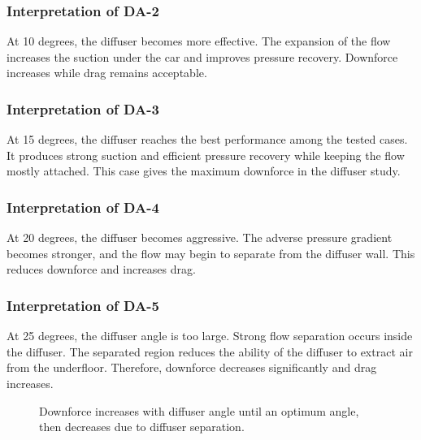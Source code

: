 \documentclass[12pt,a4paper]{article}
\begin{document}
\subsubsection{Interpretation of DA-2}

At 10 degrees, the diffuser becomes more effective. The expansion of the flow increases the suction under the car and improves pressure recovery. Downforce increases while drag remains acceptable.

\subsubsection{Interpretation of DA-3}

At 15 degrees, the diffuser reaches the best performance among the tested cases. It produces strong suction and efficient pressure recovery while keeping the flow mostly attached. This case gives the maximum downforce in the diffuser study.

\subsubsection{Interpretation of DA-4}

At 20 degrees, the diffuser becomes aggressive. The adverse pressure gradient becomes stronger, and the flow may begin to separate from the diffuser wall. This reduces downforce and increases drag.

\subsubsection{Interpretation of DA-5}

At 25 degrees, the diffuser angle is too large. Strong flow separation occurs inside the diffuser. The separated region reduces the ability of the diffuser to extract air from the underfloor. Therefore, downforce decreases significantly and drag increases.

\begin{figure}[H]
\centering
{}
\caption{Downforce increases with diffuser angle until an optimum angle, then decreases due to diffuser separation.}
\end{figure}
\end{document}

